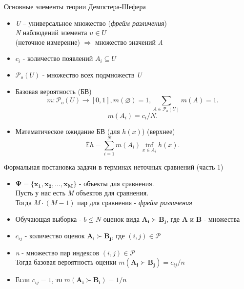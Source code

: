 \documentclass[11pt]{beamer}
\newcommand{\Rho}{%
	\mathcal{P}%
}
\begin{document}
\begin{frame}{Основные элементы теории Демпстера-Шефера}

\begin{itemize}
	\item \emph{U} – универсальное множество (\emph{фрейм различения}) \\
		\emph{N} наблюдений элемента \(u \in U\) \\
		(неточное измерение) \(\Rightarrow\) множество значений \emph{A}
	\item \(c_i\) - количество появлений \(A_i \subseteq U\)
	\item \(\Rho_o(U)\) - множество всех подмножеств \emph{U}
	\item Базовая вероятность (БВ)
		\[m : \Rho_o(U) \to [0,1], m(\varnothing) = 1, \sum \limits_{A \in \Rho_o(U)} m(A) = 1.\] 
		\[m(A_i) = c_i / N.\]
	\item Математическое ожидание БВ (для \(h(x)\)) (верхнее)
		\[\mathbb{\overline{E}} h = \sum \limits_{i=1}^N m(A_i) \inf_{x \in A_i} h(x).\]
\end{itemize}

\end{frame}
\begin{frame}{Формальная постановка задачи в терминах неточных сравнений (часть 1)}

\begin{itemize}
	\item \(\mathbf{\Psi} = \{\mathbf{x_1}, \mathbf{x_2}, \dots, \mathbf{x_M}\}\) - объекты для сравнения. \\
	Пусть у нас есть \emph{M} объектов для сравнения. \\
	Тогда \(M \cdot (M-1)\) пар для сравнения - \emph{фрейм различения}
	\item Обучающая выборка - \(b \leq N\) оценок вида \(\mathbf{A_i} \succ \mathbf{B_j}\), где \(\mathbf{A}\) и \(\mathbf{B}\) - множества
	\item \(c_{ij}\) - количество оценок \(\mathbf{A_i} \succ \mathbf{B_j}\), где \((i, j) \in \Rho\)
	\item \emph{n} - множество пар индексов \((i, j) \in \Rho\) \\
		Тогда базовая вероятность оценки \(m(\mathbf{A_i} \succ \mathbf{B_j}) = c_{ij} / n\)
	\item Если \(c_{ij} = 1\), то \(m(\mathbf{A_i} \succ \mathbf{B_i}) = 1/n\)
\end{itemize}

\end{frame}
\end{document}
